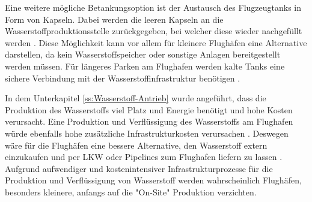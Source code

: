 %
Eine weitere mögliche Betankungsoption ist der Austausch des Flugzeugtanks in Form von Kapseln. 
Dabei werden die leeren Kapseln an die Wasserstoffproduktionsstelle zurückgegeben, 
bei welcher diese wieder nachgefüllt werden \cite{colpan2022fuel}. 
Diese Möglichkeit kann vor allem für kleinere Flughäfen eine Alternative darstellen, 
da kein Wasserstoffspeicher oder sonstige Anlagen bereitgestellt werden müssen.
Für längeres Parken am Flughafen werden kalte Tanks eine sichere Verbindung 
mit der Wasserstoffinfrastruktur benötigen \cite{colpan2022fuel}. %
%
%
%
%

In dem Unterkapitel \ref{ss:Wasserstoff-Antrieb} wurde angeführt, 
dass die Produktion des Wasserstoffs viel Platz und Energie benötigt und hohe Kosten verursacht. 
Eine Produktion und Verflüssigung des Wasserstoffs am Flughafen würde 
ebenfalls hohe zusätzliche Infrastrukturkosten verursachen \cite{dalmia2022powering}.
Deswegen wäre für die Flughäfen eine bessere Alternative, den Wasserstoff extern einzukaufen 
und per LKW oder Pipelines zum Flughafen liefern zu lassen \cite{gu2023hydrogen}.
Aufgrund aufwendiger und kostenintensiver Infrastrukturprozesse für die Produktion 
und Verflüssigung von Wasserstoff werden wahrscheinlich Flughäfen, 
besonders kleinere, anfangs auf die "On-Site" Produktion verzichten.

